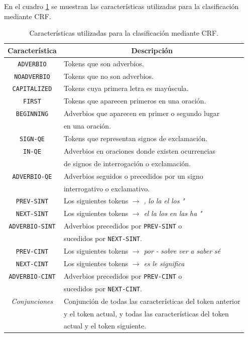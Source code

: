 \documentclass[runningheads,a4paper]{llncs}
\begin{document}
En el cuadro \ref{table:featuresCRF} se muestran las características utilizadas para la clasificación mediante CRF.

\begin{table}[ht]
 	\renewcommand{\arraystretch}{1.3}
	\renewcommand{\tabcolsep}{3pt}
	\caption{Características utilizadas para la clasificación mediante CRF.}
	\label{table:featuresCRF}
	\centering
	\begin{tabular}{c l}
		\hline\hline
		\multicolumn{1}{c}{\textbf{Característica}} & \multicolumn{1}{c}{\textbf{Descripción}} \\
		\hline
		\texttt{ADVERBIO} & Tokens que son adverbios. \\
		\texttt{NOADVERBIO} & Tokens que no son adverbios. \\
		\texttt{CAPITALIZED} & Tokens cuya primera letra es mayúscula. \\
		\texttt{FIRST} & Tokens que aparecen primeros en una oración. \\
		\texttt{BEGINNING} & Adverbios que aparecen en primer o segundo lugar \\
		& en una oración. \\
		\texttt{SIGN-QE} & Tokens que representan signos de exclamación. \\
		\texttt{IN-QE} & Adverbios en oraciones donde existen ocurrencias \\
		& de signos de interrogación o exclamación. \\
		\texttt{ADVERBIO-QE} & Adverbios seguidos o precedidos por un signo \\
		& interrogativo o exclamativo. \\
		\texttt{PREV-SINT} & Los siguientes tokens $\rightarrow$ \emph{,} \emph{lo} \emph{la} \emph{el} \emph{los} \emph{"} \\
		\texttt{NEXT-SINT} & Los siguientes tokens $\rightarrow$ \emph{el} \emph{la} \emph{los} \emph{en} \emph{las} \emph{ha} \emph{"} \\
		\texttt{ADVERBIO-SINT} & Adverbios precedidos por \texttt{PREV-SINT} o \\
		& sucedidos por \texttt{NEXT-SINT}. \\
		\texttt{PREV-CINT} & Los siguientes tokens $\rightarrow$ \emph{por} \emph{-} \emph{sobre} \emph{ver} \emph{a} \emph{saber} \emph{sé} \\
		\texttt{NEXT-CINT} & Los siguientes tokens $\rightarrow$ \emph{es} \emph{le} \emph{significa} \\
		\texttt{ADVERBIO-CINT} & Adverbios precedidos por \texttt{PREV-CINT} o \\
		& sucedidos por \texttt{NEXT-CINT}. \\
		\emph{Conjunciones} & Conjunción de todas las características del token anterior \\
		& y el token actual, y todas las características del token \\
		& actual y el token siguiente. \\
		\hline
	\end{tabular}
\end{table}
\end{document}
